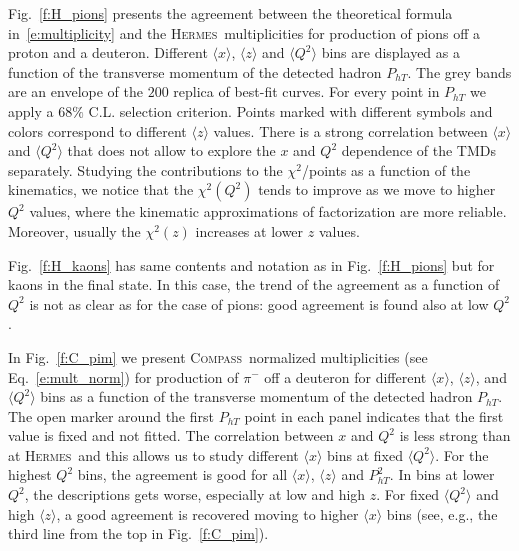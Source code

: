 \documentclass[aps,preprintnumbers,showpacs,nofootinbib,superscriptaddress,floatfix]{revtex4}
\newcommand{\AS}[1]{{\textcolor[rgb]{1,0,1}{#1}}}
\newcommand{\hermes}{\textsc{Hermes}}
\newcommand{\compass}{\textsc{Compass}}
\begin{document}
Fig.~\ref{f:H_pions} presents the agreement between the theoretical formula in~\eqref{e:multiplicity} and the \hermes\ multiplicities for production of pions off a proton and a deuteron. 
Different $\langle x \rangle$, $\langle z \rangle$ and $\langle Q^2 \rangle$
bins are displayed as a function 
of the transverse momentum of the detected hadron $P_{hT}$.
The grey bands are an envelope of the $200$ replica of best-fit curves. For every point in $P_{hT}$ we apply a $68\%$ C.L. selection criterion. 
Points marked with different symbols and colors correspond to different $\langle z \rangle$ values. There is a strong correlation between $\langle x \rangle$ and $\langle Q^2 \rangle$ that does not allow to explore the $x$ and $Q^2$ dependence of the TMDs separately. 
Studying the contributions to the $\chi^2$/points as a function of the kinematics,  
we notice that the $\chi^2(Q^2)$ 
tends to improve as we move to higher $Q^2$ values, where the kinematic approximations of factorization are more reliable. 
Moreover, usually the $\chi^2(z)$ increases at lower $z$ values.

Fig.~\ref{f:H_kaons} has same contents and notation as in Fig.~\ref{f:H_pions}
but for kaons in the final state. In this case, the trend of the agreement as
a function of $Q^2$ is not as clear as for the case of pions: good agreement
is found also at low $Q^2$.

In Fig.~\ref{f:C_pim} we present \compass\ normalized multiplicities (see
Eq.~\eqref{e:mult_norm}) for production of $\pi^-$ off a deuteron for
different $\langle x \rangle$, $\langle z \rangle$, and $\langle Q^2 \rangle$
bins as a function of the transverse momentum of the detected hadron
$P_{hT}$. The open marker around the first $P_{hT}$ point in each panel indicates that the first value is fixed and not fitted. 
The correlation between $x$ and $Q^2$ is less strong than at \hermes\ and this
allows us to study different $\langle x \rangle$ bins at fixed $\langle Q^2 \rangle$.
For the highest $Q^2$ bins, the agreement is good for all $\langle x \rangle$, $\langle z \rangle$ and $P_{hT}^2$. 
In bins at lower $Q^2$, the descriptions gets worse, especially at low and
high $z$. 
For fixed $\langle Q^2 \rangle$ and high $\langle z \rangle$, a good agreement
is recovered moving to higher $\langle x \rangle$ bins (see, e.g., the
  third line from the top in Fig.~\ref{f:C_pim}).
\end{document}
